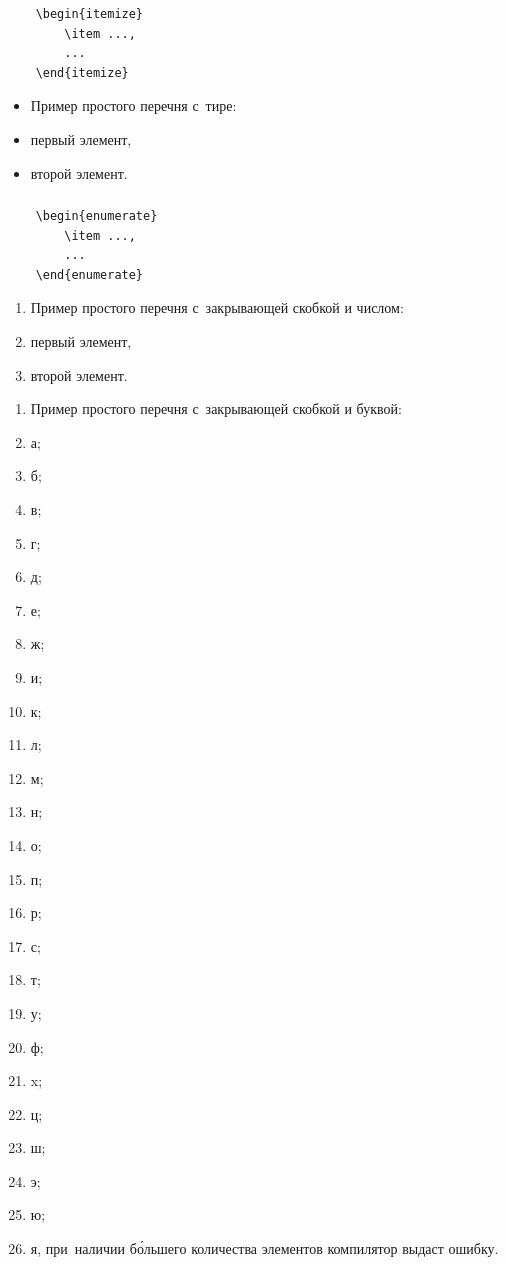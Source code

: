 \documentclass{SIBGU-state}
\begin{document}
\begin{verbatim}
	\begin{itemize}
		\item ...,
		...
	\end{itemize}
\end{verbatim}

\begin{itemize}
	\item[] Пример простого перечня с~тире:
	\item первый элемент,
	\item второй элемент.
\end{itemize}


\subsubsection{}

\begin{verbatim}
	\begin{enumerate}
		\item ...,
		...
	\end{enumerate} 
\end{verbatim}

\begin{enumerate}
	\item[] Пример простого перечня с~закрывающей скобкой и числом:
	\item первый элемент,
	\item второй элемент.
\end{enumerate}

\begin{enumerate}[label=\asbuk*), ref=\asbuk*]
	\item[] Пример простого перечня с~закрывающей скобкой и буквой:
	\item а;
	\item б;
	\item в;
	\item г;
	\item д;
	\item е;
	\item ж;
	\item и;
	\item к;
	\item л;
	\item м;
	\item н;
	\item о;
	\item п;
	\item р;
	\item с;
	\item т;
	\item у;
	\item ф;
	\item x;
	\item ц;
	\item ш;
	\item э;
	\item ю;
	\item я, при~наличии б\'ольшего количества элементов компилятор выдаст ошибку.
\end{enumerate}
\end{document}
